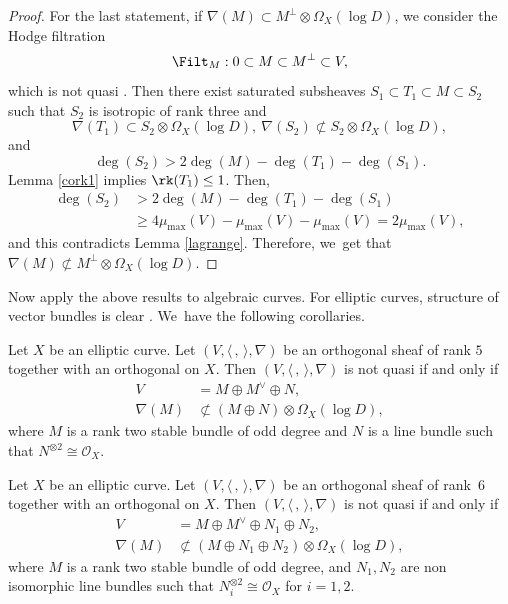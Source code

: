 \begin{proof}
For the last statement, if $ \nabla(M)\subset M^\perp\otimes\Omega_X(\log D)$, we consider the Hodge filtration
\[
\Filt_{M}:0\subset M\subset M^\perp\subset V,
\]
which is not quasi \grsemistable. Then there exist saturated subsheaves $S_1\subset T_1\subset M\subset S_2$ such that $S_2$ is isotropic of rank three and
\[
\nabla(T_1)\subset S_2\otimes\Omega_X(\log D),\ \nabla(S_2)\not\subset S_2\otimes\Omega_X(\log D),
\]
and
\[
\deg(S_2)>2\deg(M)-\deg(T_1)-\deg(S_1).
\]
Lemma \ref{cork1} implies $\rk(T_1)\leq1$. Then,
\begin{align*}
\deg(S_2) & >2\deg(M)-\deg(T_1)-\deg(S_1) \\
& \geq 4\mu_{\max}(V)-\mu_{\max}(V)-\mu_{\max}(V)=2\mu_{\max}(V),
\end{align*}
and this contradicts Lemma \ref{lagrange}. Therefore, we~get that $ \nabla(M)\not\subset M^\perp\otimes\Omega_X(\log D)$.
\end{proof}

Now apply the above results to algebraic curves. For elliptic curves, structure of vector bundles is clear \cite{A57,T93}. We~have the following corollaries.

\begin{cor}
Let $X$ be an elliptic curve. Let $(V,\langle \,, \, \rangle,\nabla)$ be an orthogonal sheaf of rank $5$ together with an orthogonal \lconnection on $X$. Then $(V,\langle \,, \, \rangle,\nabla)$ is not quasi \grsemistable if and only if
\begin{align*}
V&=M\oplus M^\vee\oplus N,
\\
\nabla(M)&\not\subset (M\oplus N)\otimes\Omega_X(\log D),
\end{align*}
where $M$ is a rank two stable bundle of odd degree and $N$ is a line bundle such that $N^{\otimes 2}\cong \mathcal{O}_X$.
\end{cor}

\begin{cor}\label{elliptic6}
Let $X$ be an elliptic curve. Let $(V,\langle \,, \, \rangle,\nabla)$ be an orthogonal sheaf of rank~$6$ together with an orthogonal \lconnection on $X$. Then $(V,\langle \,, \, \rangle,\nabla)$ is not quasi \grsemistable if and only if
\begin{align*}
V&=M\oplus M^\vee\oplus N_1\oplus N_2,
\\
\nabla(M)&\not\subset (M\oplus N_1\oplus N_2)\otimes\Omega_X(\log D),
\end{align*}
where $M$ is a rank two stable bundle of odd degree, and $N_1,N_2$ are non isomorphic line bundles such that $N_i^{\otimes 2}\cong \mathcal{O}_X$ for $i=1,2$.
\end{cor}

